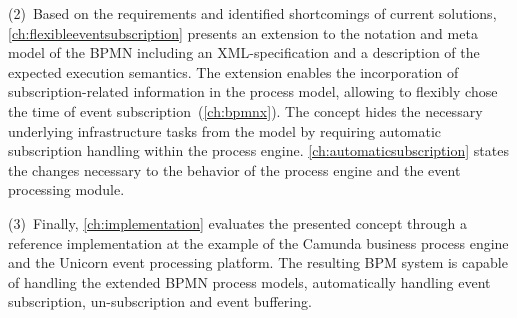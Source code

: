 (2)~Based on the requirements and identified shortcomings of current solutions, \autoref{ch:flexibleeventsubscription} presents an extension to the notation and meta model of the BPMN including an XML-specification and a description of the expected execution semantics. 
The extension enables the incorporation of subscription-related information in the process model, allowing to flexibly chose the time of event subscription~(\autoref{ch:bpmnx}).
The concept hides the necessary underlying infrastructure tasks from the model by requiring automatic subscription handling within the process engine.
\autoref{ch:automaticsubscription} states the changes necessary to the behavior of the process engine and the event processing module. %


(3)~Finally, \autoref{ch:implementation} evaluates the presented concept through a reference implementation at the example of the Camunda business process engine and the Unicorn event processing platform.
The resulting BPM system is capable of handling the extended BPMN process models, automatically handling event subscription, un-subscription and event buffering.

